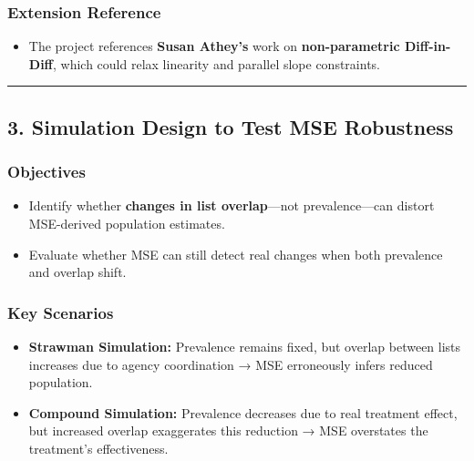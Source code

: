 \documentclass[
  12pt,
]{article}
\providecommand{\tightlist}{%
  \setlength{\itemsep}{0pt}\setlength{\parskip}{0pt}}\usepackage{longtable,booktabs,array}
\theoremstyle{plain}
\theoremstyle{definition}
\begin{document}
\subsubsection{\texorpdfstring{\textbf{Extension
Reference}}{Extension Reference}}\label{extension-reference}

\begin{itemize}
\tightlist
\item
  The project references \textbf{Susan Athey's} work on
  \textbf{non-parametric Diff-in-Diff}, which could relax linearity and
  parallel slope constraints.
\end{itemize}

\begin{center}\rule{0.5\linewidth}{0.5pt}\end{center}

\subsection{\texorpdfstring{\textbf{3. Simulation Design to Test MSE
Robustness}}{3. Simulation Design to Test MSE Robustness}}\label{simulation-design-to-test-mse-robustness}

\subsubsection{\texorpdfstring{\textbf{Objectives}}{Objectives}}\label{objectives}

\begin{itemize}
\item
  Identify whether \textbf{changes in list overlap}---not
  prevalence---can distort MSE-derived population estimates.
\item
  Evaluate whether MSE can still detect real changes when both
  prevalence and overlap shift.
\end{itemize}

\subsubsection{\texorpdfstring{\textbf{Key
Scenarios}}{Key Scenarios}}\label{key-scenarios}

\begin{itemize}
\item
  \textbf{Strawman Simulation:} Prevalence remains fixed, but overlap
  between lists increases due to agency coordination → MSE erroneously
  infers reduced population.
\item
  \textbf{Compound Simulation:} Prevalence decreases due to real
  treatment effect, but increased overlap exaggerates this reduction →
  MSE overstates the treatment's effectiveness.
\end{itemize}
\end{document}
